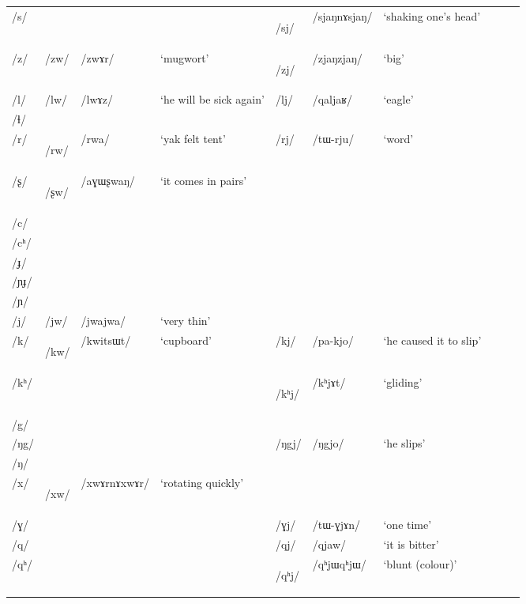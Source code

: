 \documentclass[12pt]{article}
\newcommand{\ipa}[1]{\mbox{\phon/#1/}}
\newcommand{\deux}[1]{\ipa{#1}\addtocounter{2clusters}{1}}
\newcommand{\tib}[1]{\cellcolor{lightgray}\textbf{#1}}
\newcommand{\idph}[1]{\cellcolor{gray}\textbf{#1}}
\begin{document}
\begin{landscape}
\begin{longtable}{llllllllll}
\ipa{s} & & & &\deux{sj} \idph{} &\ipa{sjaŋnɤsjaŋ} & `shaking one's head' \\ 
\ipa{z} &\deux{zw} &\ipa{zwɤr} & `mugwort' &\deux{zj} \idph{} &\ipa{zjaŋzjaŋ} & `big' \\ 
\ipa{l} &\deux{lw} &\ipa{lwɤz} & `he will be sick again' &\deux{lj} &\ipa{qaljaʁ} & `eagle' \\ 
\ipa{ɬ} & & & & & &\\ 
\ipa{r} &\deux{rw}\tib{} &\ipa{rwa} & `yak felt tent' &\deux{rj} &\ipa{tɯ-rju} & `word' \\ 
\ipa{ʂ} &\deux{ʂw} \tib{} &\ipa{aɣɯʂwaŋ} & `it comes in pairs' & & &\\ 
\ipa{c} & & & & & &\\ 
\ipa{cʰ} & & & & & &\\ 
\ipa{ɟ} & & & & & &\\ 
\ipa{ɲɟ} & & & & & &\\ 
\ipa{ɲ} & & & & & &\\ 
\ipa{j} &\deux{jw} &\ipa{jwajwa} & `very thin' & & &\\ 
\ipa{k} &\deux{kw}\tib{} &\ipa{kwitsɯt} & `cupboard' &\deux{kj} &\ipa{pa-kjo} & `he caused it to slip' \\ 
\ipa{kʰ} & & & & \deux{kʰj} \idph{}& \ipa{kʰjɤt} & `gliding' \\ 
\ipa{g} & & & & & &\\ 
\ipa{ŋg} & & & &\deux{ŋgj} &\ipa{ŋgjo} & `he slips' \\ 
\ipa{ŋ} & & & & & &\\ 
\ipa{x} &\deux{xw}\idph{} & \ipa{xwɤrnɤxwɤr}& `rotating quickly' & & &\\ 
\ipa{ɣ} & & & &\deux{ɣj} &\ipa{tɯ-ɣjɤn} & `one time' \\ 
\ipa{q} & & & &\deux{qj} &\ipa{qjaw} & `it is bitter' \\ 
\ipa{qʰ} & & & &\deux{qʰj} \idph{} &\ipa{qʰjɯqʰjɯ} & `blunt (colour)' \\ 

\end{longtable}
\end{landscape}
\end{document}
